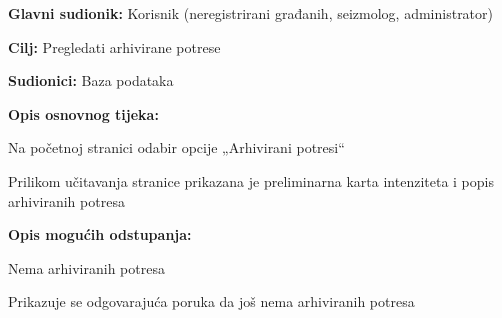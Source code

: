 			\noindent {}
			\begin{packed_item}
				
				\item \textbf{Glavni sudionik:} Korisnik (neregistrirani građanih, seizmolog, administrator)
				\item \textbf{Cilj:} Pregledati arhivirane potrese
				\item \textbf{Sudionici:} Baza podataka
				
				\item \textbf{Opis osnovnog tijeka:}
				
				\item[] \begin{packed_enum}
					\item Na početnoj stranici odabir opcije „Arhivirani potresi“
					\item Prilikom učitavanja stranice prikazana je preliminarna karta intenziteta i popis arhiviranih potresa
				\end{packed_enum}
				
				\item  \textbf{Opis mogućih odstupanja:}
				
				\item[] \begin{packed_item}
					
					\item[2.a] Nema arhiviranih potresa
					\item[] \begin{packed_enum}
						
						\item Prikazuje se odgovarajuća poruka da još nema arhiviranih potresa
						
					\end{packed_enum}
					
				\end{packed_item}
				
			\end{packed_item}
			
